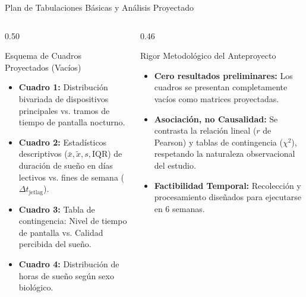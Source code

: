 \documentclass[10pt, aspectratio=169]{beamer}
\begin{document}
\begin{frame}{Plan de Tabulaciones Básicas y Análisis Proyectado}
    \begin{columns}[T]
        \begin{column}{0.50\textwidth}
            \begin{block}{Esquema de Cuadros Proyectados (Vacíos)}
                \begin{itemize}
                    \item \textbf{Cuadro 1:} Distribución bivariada de dispositivos principales vs. tramos de tiempo de pantalla nocturno.
                    \item \textbf{Cuadro 2:} Estadísticos descriptivos ($\bar{x}, \tilde{x}, s, \text{IQR}$) de duración de sueño en días lectivos vs. fines de semana ($\Delta t_{\text{jetlag}}$).
                    \item \textbf{Cuadro 3:} Tabla de contingencia: Nivel de tiempo de pantalla vs. Calidad percibida del sueño.
                    \item \textbf{Cuadro 4:} Distribución de horas de sueño según sexo biológico.
                \end{itemize}
            \end{block}
        \end{column}
        \begin{column}{0.46\textwidth}
            \begin{alertblock}{Rigor Metodológico del Anteproyecto}
                \begin{itemize}
                    \item \textbf{Cero resultados preliminares:} Los cuadros se presentan completamente vacíos como matrices proyectadas.
                    \item \textbf{Asociación, no Causalidad:} Se contrasta la relación lineal ($r$ de Pearson) y tablas de contingencia ($\chi^2$), respetando la naturaleza observacional del estudio.
                    \item \textbf{Factibilidad Temporal:} Recolección y procesamiento diseñados para ejecutarse en 6 semanas.
                \end{itemize}
            \end{alertblock}
        \end{column}
    \end{columns}
\end{frame}
\end{document}
